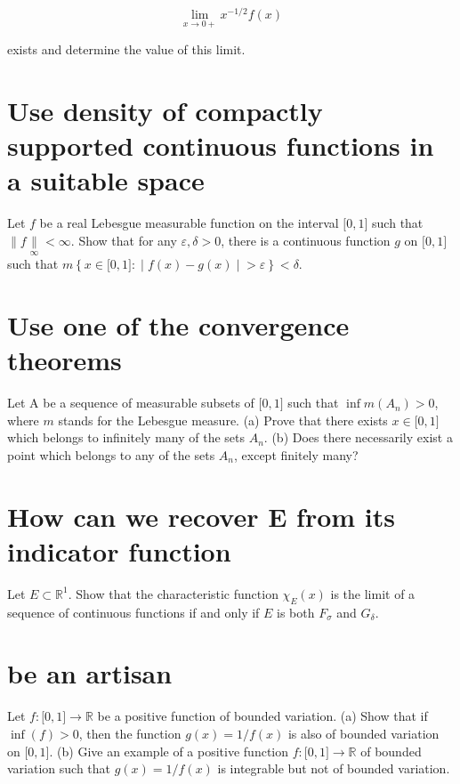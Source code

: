 \documentclass{qlnotes-export}
\begin{document}
\[\lim\limits_{x\rightarrow 0 +}x^{- 1/2}f(x)\]

exists and determine the value of this limit.

\chapter{Use density of compactly supported continuous functions in a suitable space}\label{use-density-of-compactly-supported-continuous-functions-in-a-suitable-space}

Let \(f\) be a real Lebesgue measurable function on the interval \(\lbrack 0,1\rbrack\) such that \(\parallel f\underset{\infty}{\parallel} < \infty\). Show that for any \(\varepsilon,\delta > 0\), there is a continuous function \(g\) on \(\lbrack 0,1\rbrack\) such that \(m\left\{ x \in \lbrack 0,1\rbrack: \middle| f(x) - g(x) \middle| > \varepsilon \right\} < \delta\).

\chapter{Use one of the convergence theorems}\label{use-one-of-the-convergence-theorems}

Let A be a sequence of measurable subsets of \(\lbrack 0,1\rbrack\) such that \(\inf m\left( A_{n} \right) > 0\), where \(m\) stands for the Lebesgue measure. (a) Prove that there exists \(x \in \lbrack 0,1\rbrack\) which belongs to infinitely many of the sets \(A_{n}\). (b) Does there necessarily exist a point which belongs to any of the sets \(A_{n}\), except finitely many?

\chapter{How can we recover E from its indicator function}\label{how-can-we-recover-e-from-its-indicator-function}

Let \(E \subset {\mathbb{R}}^{1}\). Show that the characteristic function \(\chi_{E}(x)\) is the limit of a sequence of continuous functions if and only if \(E\) is both \(F_{\sigma}\) and \(G_{\delta}\).

\chapter{be an artisan}\label{be-an-artisan}

Let \(f:\lbrack 0,1\rbrack\rightarrow{\mathbb{R}}\) be a positive function of bounded variation. (a) Show that if \(\inf(f) > 0\), then the function \(g(x) = 1/f(x)\) is also of bounded variation on \(\lbrack 0,1\rbrack\). (b) Give an example of a positive function \(f:\lbrack 0,1\rbrack\rightarrow{\mathbb{R}}\) of bounded variation such that \(g(x) = 1/f(x)\) is integrable but not of bounded variation.
\end{document}
